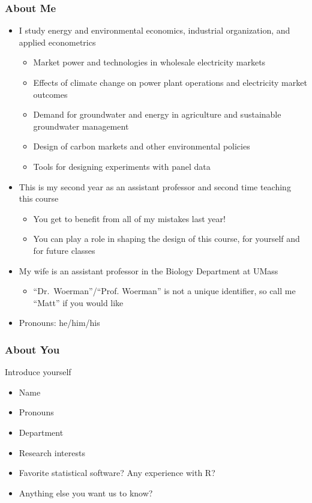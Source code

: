 \documentclass{beamer}
\begin{document}
\begin{frame}\frametitle{About Me}
    \begin{itemize}
        \item I study energy and environmental economics, industrial organization, and applied econometrics
        \begin{itemize}
            \item Market power and technologies in wholesale electricity markets
            \item Effects of climate change on power plant operations and electricity market outcomes
            \item Demand for groundwater and energy in agriculture and sustainable groundwater management
            \item Design of carbon markets and other environmental policies
            \item Tools for designing experiments with panel data
        \end{itemize}
        \item This is my second year as an assistant professor and second time teaching this course
        \begin{itemize}
            \item You get to benefit from all of my mistakes last year!
            \item You can play a role in shaping the design of this course, for yourself and for future classes
        \end{itemize}
        \item My wife is an assistant professor in the Biology Department at UMass
        \begin{itemize}
            \item ``Dr.\ Woerman''/``Prof. Woerman'' is not a unique identifier, so call me ``Matt'' if you would like
        \end{itemize}
        \item Pronouns: he/him/his
    \end{itemize}
\end{frame}

\begin{frame}\frametitle{About You}
    Introduce yourself
    \begin{itemize}
        \item Name
        \item Pronouns
        \item Department
        \item Research interests
        \item Favorite statistical software? Any experience with R?
        \item Anything else you want us to know?
    \end{itemize}
\end{frame}
\end{document}
